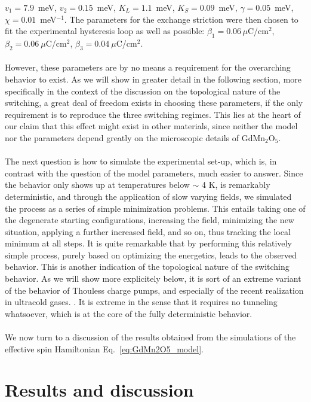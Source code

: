 $v_1 = 7.9$~meV, $v_2 = 0.15$~meV, $K_L = 1.1$~meV, $K_S = 0.09$~meV, $\gamma = 0.05$~meV, $\chi=0.01$~meV$^{-1}$.
The parameters for the exchange striction were then chosen to fit the experimental hysteresis loop as well as possible:
${\beta_1 = 0.06\,\mu}$C/cm$^2$, $\beta_2 = 0.06\:\mu$C/cm$^2$, $\beta_3 = 0.04\:\mu$C/cm$^2$.
\\\\
However, these parameters are by no means a requirement for the overarching behavior to exist. As we will show in greater detail in the following section, more specifically in the context of the discussion on the topological nature of the switching, a great deal of freedom exists in choosing these parameters, if the only requirement is to reproduce the three switching regimes.
This lies at the heart of our claim that this effect might exist in other materials, since neither the model nor the parameters depend greatly on the microscopic details of GdMn$_2$O$_5$. 
\\\\
The next question is how to simulate the experimental set-up, which is, in contrast with the question of the model parameters, much easier to answer.
Since the behavior only shows up at temperatures below $\sim$ 4 K, is remarkably deterministic, and through the application of slow varying fields, we simulated the process as a series of simple minimization problems.
This entails taking one of the degenerate starting configurations, increasing the field, minimizing the new situation, applying a further increased field, and so on, thus tracking the local minimum at all steps.
It is quite remarkable that by performing this relatively simple process, purely based on optimizing the energetics, leads to the observed behavior.
This is another indication of the topological nature of the switching behavior.
As we will show more explicitely below, it is sort of an extreme variant of the behavior of Thouless charge pumps, and especially of the recent realization in ultracold gases. \cite{Rice82,Thouless1982,Thouless83,Lohse16,Nakajima16, Atala13}.
It is extreme in the sense that it requires no tunneling whatsoever, which is at the core of the fully deterministic behavior.
\\\\

We now turn to a discussion of the results obtained from the simulations of the effective spin Hamiltonian Eq.~\eqref{eq:GdMn2O5_model}.

\section{Results and discussion}


